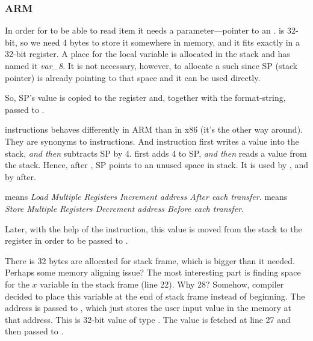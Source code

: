 \subsubsection{ARM}

\myparagraph{\OptimizingKeilVI (\ThumbMode)}



\myindex{\CLanguageElements!\Pointers}

In order for \scanf to be able to read item it needs a parameter---pointer to an \Tint.
\Tint is 32-bit, so we need 4 bytes to store it somewhere in memory, and it fits exactly in a 32-bit register.
A place for the local variable  is allocated in the stack and \IDA
has named it \emph{var\_8}. It is not necessary, however, to allocate a such since \ac{SP} (\gls{stack pointer}) is already pointing to that space and it can be used directly.

So, \ac{SP}'s value is copied to the  register and, together with the format-string, passed to \scanf.

 instructions behaves differently in ARM than in x86 (it's the other way around).
They are synonyms to  instructions.
And  instruction first writes a value into the stack, \emph{and then} subtracts \ac{SP} by 4.
 first adds 4 to \ac{SP}, \emph{and then} reads a value from the stack.
Hence, after , \ac{SP} points to an unused space in stack.
It is used by \scanf, and by \printf after.

 means \emph{Load Multiple Registers Increment address After each transfer}.
 means \emph{Store Multiple Registers Decrement address Before each transfer}.

Later, with the help of the  instruction, this value is moved from the stack to the  register in order to be passed to \printf.




There is 32 bytes are allocated for stack frame, which is bigger than it needed. Perhaps some memory aligning issue?
The most interesting part is finding space for the $x$ variable in the stack frame (line 22).
Why 28? Somehow, compiler decided to place this variable at the end of stack frame instead of beginning.
The address is passed to \scanf, which just stores the user input value in the memory at that address.
This is 32-bit value of type \Tint.
The value is fetched at line 27 and then passed to \printf.

